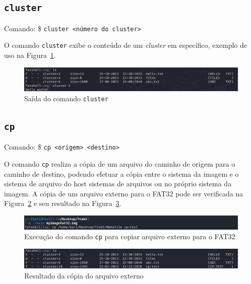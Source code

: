 \documentclass[
    12pt,				%
    oneside,   	        %
    a4paper,			%
    english,			%
    french,				%
    spanish,			%
    brazil,				%
    ]{pacotes/abntex2}
\begin{document}

\subsection{\texttt{cluster}}
\label{subsec:cluster}
Comando: \$ \texttt{cluster <número do cluster>}

O comando \texttt{cluster} exibe o conteúdo de um \textit{cluster} em específico, exemplo de uso na Figura~\ref{fig:cluester}.

\begin{figure}[H]
    \centering
    \includegraphics[width=450pt]{figuras/resultados/2-cluster.PNG}
    \caption{Saída do comando \texttt{cluster}}
    \label{fig:cluester}
\end{figure}


\subsection{\texttt{cp}}
\label{subsec:cp}
Comando: \$ \texttt{cp <origem> <destino>}  

O comando \texttt{cp} realiza a cópia de um arquivo do caminho de origem para o caminho de destino, podendo efetuar a cópia entre o sistema da imagem e o sistema de arquivo do host sistemas de arquivos ou no próprio sistema da imagem. A cópia de um arquivo externo para o FAT32 pode ser verificada na Figura~\ref{fig:cp-externo-interno-1} e seu resultado na Figura~\ref{fig:cp-externo-interno-2}.

\begin{figure}[H]
    \centering
    \includegraphics[width=450pt]{figuras/resultados/3.1-cp-externo-interno.PNG}
    \caption{Execução do comando \texttt{cp} para copiar arquivo externo para o FAT32}
    \label{fig:cp-externo-interno-1}
\end{figure}

\begin{figure}[H]
    \centering
    \includegraphics[width=450pt]{figuras/resultados/3.2-cp-externo-interno.PNG}
    \caption{Resultado da cópia do arquivo externo}
    \label{fig:cp-externo-interno-2}
\end{figure}
\end{document}
